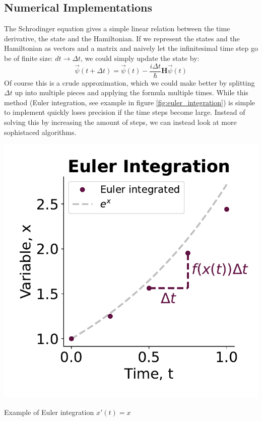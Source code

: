 \subsection{Numerical Implementations}\label{sec:numerical_implementations}
The Schrodinger equation gives a simple linear relation between the time derivative, the state and the Hamiltonian. If we represent the states and the Hamiltonian as vectors and a matrix and naively let the infinitesimal time step go be of finite size: $dt\to\Delta t$, we could simply update the state by:
\begin{equation}
    \Vec{\psi}(t + \Delta t) =  \Vec{\psi}(t) - \frac{i\Delta t}{\hbar}\boldsymbol{H} \Vec{\psi}(t)
\end{equation}
Of course this is a crude approximation, which we could make better by splitting $\Delta t$ up into multiple pieces and applying the formula multiple times. While this method (Euler integration, see example in figure \ref{fig:euler_integration}) is simple to implement quickly loses precision if the time steps become large. Instead of solving this by increasing the amount of steps, we can instead look at more sophistaced algorithms.
\begin{marginfigure}
    \centering
    \includegraphics[]{Figs/Theory/euler_integration.pdf}
    \caption{Example of Euler integration $x'(t) = x$}
    \label{fig:euler_integration}
\end{marginfigure}


